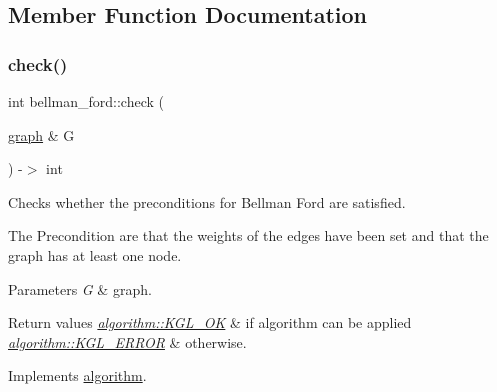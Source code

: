 \subsection{Member Function Documentation}
\mbox{\label{classbellman__ford_a7aadad38ac3fcccc8dee69896e183ccc}} 
\subsubsection{\texorpdfstring{check()}{check()}}
{\footnotesize\ttfamily int bellman\+\_\+ford\+::check (\begin{DoxyParamCaption}\item[{\mbox{\hyperlink{classgraph}{graph}} \&}]{G }\end{DoxyParamCaption}) -\/$>$ int\hspace{0.3cm}{\ttfamily [virtual]}}



Checks whether the preconditions for Bellman Ford are satisfied. 

The Precondition are that the weights of the edges have been set and that the graph has at least one node.


\begin{DoxyParams}{Parameters}
{\em G} & graph. \\
\hline
\end{DoxyParams}

\begin{DoxyRetVals}{Return values}
{\em \mbox{\hyperlink{classalgorithm_af1a0078e153aa99c24f9bdf0d97f6710aae4c1cd7fe8d8cf4b143241a6e7c31cf}{algorithm\+::\+K\+G\+L\+\_\+\+OK}}} & if algorithm can be applied \\
\hline
{\em \mbox{\hyperlink{classalgorithm_af1a0078e153aa99c24f9bdf0d97f6710ae67bf27b2ef31f73e545a7f9f4a69556}{algorithm\+::\+K\+G\+L\+\_\+\+E\+R\+R\+OR}}} & otherwise. \\
\hline
\end{DoxyRetVals}


Implements \mbox{\hyperlink{classalgorithm_a05c0f25463eb35a77b2d73fc06bb2c0e}{algorithm}}.

\mbox{\label{classbellman__ford_a33208125fd0b500ae0ce5cab1ef4e3c1}} 
